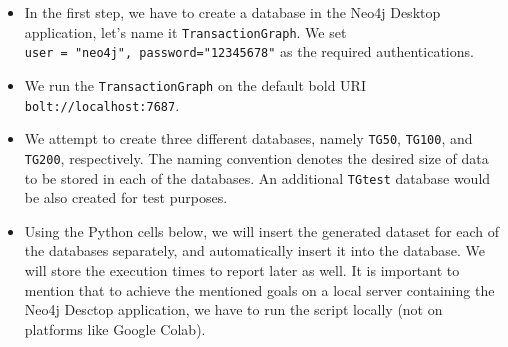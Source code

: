 \begin{itemize}
\tightlist
\item
  In the first step, we have to create a database in the Neo4j Desktop
  application, let's name it \texttt{TransactionGraph}. We set
  \texttt{user\ =\ "neo4j",\ password="12345678"} as the required
  authentications.
\item
  We run the \texttt{TransactionGraph} on the default bold URI
  \texttt{bolt://localhost:7687}.
\item
  We attempt to create three different databases, namely \texttt{TG50},
  \texttt{TG100}, and \texttt{TG200}, respectively. The naming
  convention denotes the desired size of data to be stored in each of
  the databases. An additional \texttt{TGtest} database would be also
  created for test purposes.
\item
  Using the Python cells below, we will insert the generated dataset for
  each of the databases separately, and automatically insert it into the
  database. We will store the execution times to report later as well.
  It is important to mention that to achieve the mentioned goals on a
  local server containing the Neo4j Desctop application, we have to run
  the script locally (not on platforms like Google Colab).
\end{itemize}

